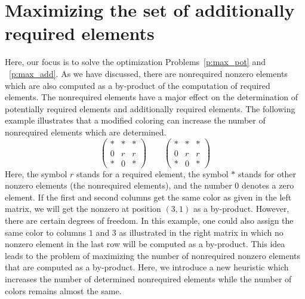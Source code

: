 \documentclass[12pt, twoside,a4paper,toc=bibliography]{scrbook}
\begin{document}
\section{Maximizing the set of additionally required elements}
\label{s.max.pot.req}
Here, our focus is to solve the optimization Problems~\ref{p:max_pot} and ~\ref{p:max_add}.
As we have discussed, there are nonrequired nonzero elements
which are also computed as a by-product of the computation of required elements.
The nonrequired elements have a major effect on
the determination of potentially required elements
and additionally required elements.
The following example illustrates that
a modified coloring can increase the number of nonrequired elements
which are determined.
\begin{equation}
\left(\begin{array}{rrb}
* & * & *\\
0 & r & r \\
* & 0 & *
\end{array}\right)
\qquad
\left(\begin{array}{rbr}
* & * & *\\
0 & r & r \\
* & 0 & *
\end{array}\right)
\label{twocolorings}
\end{equation}
Here, the symbol $r$ stands for a required element,
the symbol \textit{$*$} stands for other nonzero elements (the nonrequired elements),
and the number $0$ denotes a zero element.
If the first and second columns get the same color as given in the left matrix,
we will get the nonzero at position $(3,1)$ as a by-product.
However, there are certain degrees of freedom. In
this example, one could also assign the same color to columns $1$ and
$3$ as illustrated in the right matrix
in which no nonzero element in the last row will be computed
as a by-product. This idea leads to the problem of maximizing
the number of nonrequired nonzero elements that are computed as a by-product.
Here, we introduce a new heuristic which increases the number of determined nonrequired elements 
while the number of colors remains almost the same.
\end{document}

